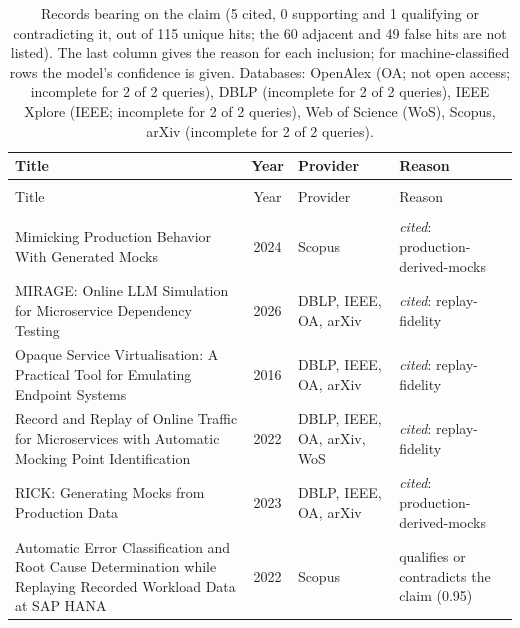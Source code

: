 
\begingroup\footnotesize
\begin{longtable}{@{}%
  >{\raggedright\arraybackslash}p{}c%
  >{\raggedright\arraybackslash}p{}%
  >{\raggedright\arraybackslash}p{}@{}}
\caption{Records bearing on the claim (5 cited, 0 supporting and 1 qualifying or contradicting it, out of 115 unique hits; the 60 adjacent and 49 false hits are not listed). The last column gives the reason for each inclusion; for machine-classified rows the model's confidence is given. Databases: OpenAlex (OA; not open access; incomplete for 2 of 2 queries), DBLP (incomplete for 2 of 2 queries), IEEE Xplore (IEEE; incomplete for 2 of 2 queries), Web of Science (WoS), Scopus, arXiv (incomplete for 2 of 2 queries).}\label{tab:t-record-replay}\\
\toprule
Title & Year & Provider & Reason \\
\midrule
\endfirsthead
\multicolumn{4}{@{}l}{\emph{\tablename~\thetable{} (cont.)}}\\
\toprule
Title & Year & Provider & Reason \\
\midrule
\endhead
\midrule \multicolumn{4}{r@{}}{\emph{continued on next page}}\\
\endfoot
\bottomrule
\endlastfoot
Mimicking Production Behavior With Generated Mocks & 2024 & Scopus & \emph{cited}: production-derived-mocks \\
MIRAGE: Online LLM Simulation for Microservice Dependency Testing & 2026 & DBLP, IEEE, OA, arXiv & \emph{cited}: replay-fidelity \\
Opaque Service Virtualisation: A Practical Tool for Emulating Endpoint Systems & 2016 & DBLP, IEEE, OA, arXiv & \emph{cited}: replay-fidelity \\
Record and Replay of Online Traffic for Microservices with Automatic Mocking Point Identification & 2022 & DBLP, IEEE, OA, arXiv, WoS & \emph{cited}: replay-fidelity \\
RICK: Generating Mocks from Production Data & 2023 & DBLP, IEEE, OA, arXiv & \emph{cited}: production-derived-mocks \\
Automatic Error Classification and Root Cause Determination while Replaying Recorded Workload Data at SAP HANA & 2022 & Scopus & qualifies or contradicts the claim (0.95) \\
\end{longtable}
\endgroup
